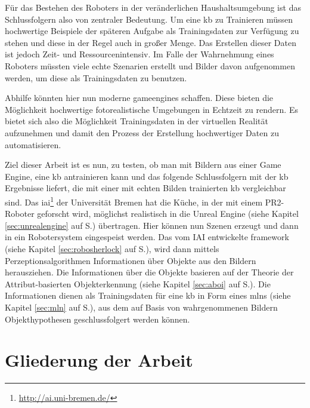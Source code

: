 Für das Bestehen des Roboters in der veränderlichen Haushaltsumgebung ist das Schlussfolgern also von zentraler Bedeutung. Um eine \gls{kb} zu Trainieren müssen hochwertige Beispiele der späteren Aufgabe als Trainingsdaten zur Verfügung zu stehen und diese in der Regel auch in großer Menge. Das Erstellen dieser Daten ist jedoch Zeit- und Ressourcenintensiv. Im Falle der Wahrnehmung eines Roboters müssten viele echte Szenarien erstellt und Bilder davon aufgenommen werden, um diese als Trainingsdaten zu benutzen. \par      
Abhilfe könnten hier nun moderne \glspl{gameengine} schaffen. Diese bieten die Möglichkeit hochwertige fotorealistische Umgebungen in Echtzeit zu rendern. Es bietet sich also die Möglichkeit Trainingsdaten in der virtuellen Realität aufzunehmen und damit den Prozess der Erstellung hochwertiger Daten zu automatisieren. \par  
Ziel dieser Arbeit ist es nun, zu testen, ob man mit Bildern aus einer Game Engine, eine \gls{kb} antrainieren kann und das folgende Schlussfolgern mit der \gls{kb} Ergebnisse liefert, die mit einer mit echten Bilden trainierten \gls{kb} vergleichbar sind. Das \gls{iai}\footnote{\url{http://ai.uni-bremen.de/}} der Universität Bremen hat die Küche, in der mit einem PR2-Roboter geforscht wird, möglichst realistisch in die Unreal Engine (siehe Kapitel \ref{sec:unrealengine} auf S.\pageref{sec:unrealengine}) übertragen. Hier können nun Szenen erzeugt und dann in ein Robotersystem eingespeist werden. Das vom IAI entwickelte \gls{framework} \robosherlock (siehe Kapitel \ref{sec:robosherlock} auf S.\pageref{sec:robosherlock}), wird dann mittels Perzeptionsalgorithmen Informationen über Objekte aus den Bildern herausziehen. Die Informationen über die Objekte basieren auf der Theorie der Attribut-basierten Objekterkennung (siehe Kapitel \ref{sec:aboi} auf S.\pageref{sec:aboi}). Die Informationen dienen als Trainingsdaten für eine \gls{kb} in Form eines \gls{mlns} (siehe Kapitel \ref{sec:mln} auf S.\pageref{sec:mln}), aus dem auf Basis von wahrgenommenen Bildern Objekthypothesen  geschlussfolgert werden können.  

\section{Gliederung der Arbeit}
\label{sec:gliederung}


   

